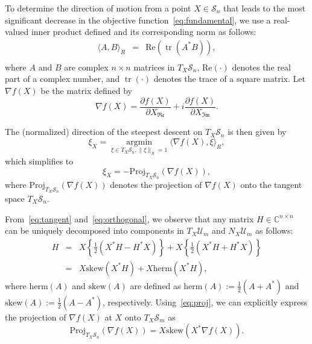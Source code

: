 \documentclass[sn-mathphys-num]{sn-jnl}%
\theoremstyle{thmstyleone}%
\theoremstyle{thmstyletwo}%
\theoremstyle{thmstylethree}%
\begin{document}
To determine the direction of motion from a point $X\in\mathcal{S}_n$ that leads to the most significant decrease in the objective function~\eqref{eq:fundamental}, 
we use a real-valued inner product defined 
and its corresponding norm 
as follows:
\begin{eqnarray}\label{eq:inner}
    \langle A, B \rangle_{R} 
&=& \mbox{Re}(\operatorname{tr}(A^* B)),\\
\end{eqnarray}
where $A$ and $B$ are complex $n\times n$ matrices in $T_{X} \mathcal{S}_n$, 
$\mbox{Re}(\cdot)$ denotes the real part of a complex number, and $\operatorname{tr}(\cdot)$ denotes the trace of a square matrix.
% 
Let $\nabla f(X)$ be the matrix defined by
\begin{equation*}
     \nabla  f (X) =  
\dfrac{\partial f(X)}{\partial X_{\mathfrak{Re}}}+i\dfrac{\partial f(X)}{\partial X_{\mathfrak{Im}}}.
\end{equation*}



The (normalized) direction of the steepest descent on $T_X\mathcal{S}_n$ is then given by 
\begin{equation}\label{eq:steep}
\xi_X=\underset{\xi\in T_X\mathcal{S}_n, \|\xi\|_X = 1}{\operatorname{argmin}} \langle \nabla f(X), \xi\rangle_R, 
\end{equation}
which simplifies to 
\[
\xi_X  = -\mathrm{Proj}_{T_X\mathcal{S}_n} (\nabla f(X)),
\]
where $\mathrm{Proj}_{T_X\mathcal{S}_n} (\nabla f(X))$ denotes the projection of  $\nabla f(X)$ onto the tangent space $T_X\mathcal{S}_n$.

 From~\eqref{eq:tangent} and~\eqref{eq:orthogonal}, we observe that any matrix $H\in\mathbb{C}^{n\times n}$ can be uniquely decomposed into 
 components in  $T_X\mathcal{U}_m$ and $N_X\mathcal{U}_m$ as follows: 
\begin{eqnarray}\label{eq:proj}
    H &=&
X\left\{ \frac{1}{2}(X^*H - H^* X)\right\}+X\left\{ \frac{1}{2}(X^* H + H^* X)\right\}\nonumber\\
&=& X \mathrm{skew}(X^* H) + X \mathrm{herm}(X^*H),
\end{eqnarray}
where $\mathrm{herm}(A)$ and $\mathrm{skew}(A)$ are defined as 
$\mathrm{herm}(A) :=\frac{1}{2}(A+A^*)$ and $\mathrm{skew}(A):= \frac{1}{2}(A-A^*)$, respectively.  Using~\eqref{eq:proj}, we can explicitly express the projection of $\nabla f(X)$ at $X$ onto $T_X\mathcal{S}_m$ as 
\begin{equation}\label{eq:gradF}
\mathrm{Proj}_{T_X\mathcal{S}_n} (\nabla f(X)) = X \mathrm{skew}(X^* \nabla f(X)). 
\end{equation}
\end{document}
